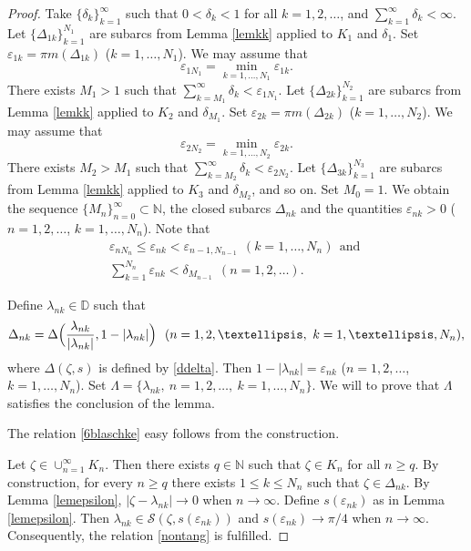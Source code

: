 \documentclass[a4paper,oneside,11pt]{amsart}
\numberwithin{equation}{section}
\theoremstyle{plain}
\theoremstyle{definition}
\begin{document}
\begin{proof} 
Take $\{\delta_k \}_{k=1}^\infty$ such that $0<\delta_k<1$ for all $k=1,2, \ldots$, 
and $\sum_{k=1}^\infty \delta_k<\infty$. 
Let $\{\Delta_{1k}\}_{k=1}^{N_1}$ are subarcs from Lemma \ref{lemkk} applied to $K_1$ and $\delta_1$. 
Set $\varepsilon_{1k}=\pi m(\Delta_{1k})$ ($k=1,\ldots, N_1$). We may assume that 
\begin{equation*} \varepsilon_{1N_1}=\min_{k=1,\ldots, N_1}\varepsilon_{1k}. \end{equation*}
There exists $M_1>1$ such that $\sum_{k=M_1}^\infty \delta_k< \varepsilon_{1N_1}$.
Let $\{\Delta_{2k}\}_{k=1}^{N_2}$ are subarcs from Lemma \ref{lemkk} applied to $K_2$ and $\delta_{M_1}$. 
Set   $\varepsilon_{2k}=\pi m(\Delta_{2k})$ ($k=1,\ldots, N_2$). We may assume that 
\begin{equation*} \varepsilon_{2N_2}=\min_{k=1,\ldots, N_2}\varepsilon_{2k}. \end{equation*}
There exists $M_2>M_1$ such that $\sum_{k=M_2}^\infty \delta_k< \varepsilon_{2N_2}$. 
Let $\{\Delta_{3k}\}_{k=1}^{N_3}$ are subarcs from Lemma \ref{lemkk} applied to $K_3$ and $\delta_{M_2}$, and so on. 
Set $M_0=1$. 
We obtain  the sequence $\{M_n\}_{n=0}^\infty\subset\mathbb N$, the 
 closed subarcs $\Delta_{nk}$ and the quantities $\varepsilon_{nk}>0$ ($n=1,2, \ldots$, $k=1,\ldots, N_n$). 
Note that \begin{gather*}
\varepsilon_{nN_n}\leq\varepsilon_{nk}<\varepsilon_{n-1,N_{n-1}} \ \ (k=1, \ldots, N_n) \ \ \text{and }\\  \sum_{k=1}^{N_n}\varepsilon_{nk}<\delta_{M_{n-1}}\ \ (n=1,2,\ldots).  \end{gather*}

Define $\lambda_{nk}\in\mathbb D$ such that 
\begin{equation*} \Delta_{nk}=\Delta\Bigl(\frac{\lambda_{nk}}{|\lambda_{nk}|}, 1-|\lambda_{nk}|\Bigr) \ \ (n=1,2, \ldots, \ k=1,\ldots, N_n),
 \end{equation*}
where $\Delta(\zeta, s)$ is defined by \eqref{ddelta}. Then $1-|\lambda_{nk}|=\varepsilon_{nk}$ ($n=1,2, \ldots$, $k=1,\ldots, N_n$). 
Set $\Lambda=\{\lambda_{nk}, \ n=1,2, \ldots,\ k=1,\ldots, N_n\}$. 
We will to prove that $\Lambda$ satisfies the conclusion of the lemma.

The relation \eqref{6blaschke} easy follows from the construction. 

Let $\zeta\in \cup_{n=1}^\infty K_n$. Then there exists $q\in\mathbb N$ such that $\zeta\in  K_n$ for all $n\geq q$. By construction, 
for every $n\geq q$ there exists $1\leq k\leq N_n$ such that $\zeta\in\Delta_{nk}$. By Lemma \ref{lemepsilon}, 
$|\zeta-\lambda_{nk}|\to 0$ when $n\to\infty$. Define $s(\varepsilon_{nk})$ as in Lemma \ref{lemepsilon}. Then 
  $\lambda_{nk}\in\mathcal S(\zeta, s(\varepsilon_{nk}))$ and $s(\varepsilon_{nk})\to\pi/4$ when $n\to\infty$. Consequently,  the relation \eqref{nontang} is fulfilled. 


\end{proof}
\end{document}
